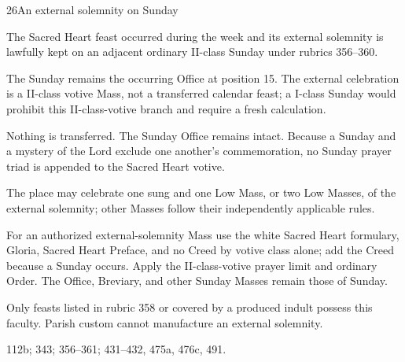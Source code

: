 \begin{casefile}{26}{An external solemnity on Sunday}
\item[Calendar facts] The Sacred Heart feast occurred during the week and its external solemnity is lawfully kept on an adjacent ordinary II-class Sunday under rubrics 356--360.
\item[Ranks and rows] The Sunday remains the occurring Office at position 15.  The external celebration is a II-class votive Mass, not a transferred calendar feast; a I-class Sunday would prohibit this II-class-votive branch and require a fresh calculation.
\item[Impeded item] Nothing is transferred.  The Sunday Office remains intact.  Because a Sunday and a mystery of the Lord exclude one another's commemoration, no Sunday prayer triad is appended to the Sacred Heart votive.
\item[Mass category] The place may celebrate one sung and one Low Mass, or two Low Masses, of the external solemnity; other Masses follow their independently applicable rules.
\item[Assembly] For an authorized external-solemnity Mass use the white Sacred Heart formulary, Gloria, Sacred Heart Preface, and no Creed by votive class alone; add the Creed because a Sunday occurs.  Apply the II-class-votive prayer limit and ordinary Order.  The Office, Breviary, and other Sunday Masses remain those of Sunday.
\item[Boundary] Only feasts listed in rubric 358 or covered by a produced indult possess this faculty.  Parish custom cannot manufacture an external solemnity.
\item[Rubric locus] 112b; 343; 356--361; 431--432, 475a, 476c, 491.
\end{casefile}

